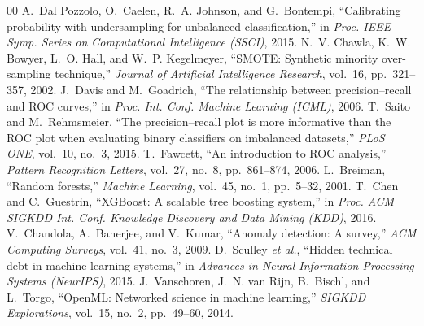 \documentclass[conference]{IEEEtran}
\begin{document}
\begin{thebibliography}{00}
 A.~Dal Pozzolo, O.~Caelen, R.~A. Johnson, and
G.~Bontempi, ``Calibrating probability with undersampling for unbalanced
classification,'' in \emph{Proc. IEEE Symp. Series on Computational
Intelligence (SSCI)}, 2015.
 N.~V. Chawla, K.~W. Bowyer, L.~O. Hall, and
W.~P. Kegelmeyer, ``SMOTE: Synthetic minority over-sampling technique,''
\emph{Journal of Artificial Intelligence Research}, vol.~16, pp.~321--357,
2002.
 J.~Davis and M.~Goadrich, ``The relationship between
precision--recall and ROC curves,'' in \emph{Proc. Int. Conf. Machine Learning
(ICML)}, 2006.
 T.~Saito and M.~Rehmsmeier, ``The precision--recall plot
is more informative than the ROC plot when evaluating binary classifiers on
imbalanced datasets,'' \emph{PLoS ONE}, vol.~10, no.~3, 2015.
 T.~Fawcett, ``An introduction to ROC analysis,''
\emph{Pattern Recognition Letters}, vol.~27, no.~8, pp.~861--874, 2006.
 L.~Breiman, ``Random forests,'' \emph{Machine
Learning}, vol.~45, no.~1, pp.~5--32, 2001.
 T.~Chen and C.~Guestrin, ``XGBoost: A scalable tree
boosting system,'' in \emph{Proc. ACM SIGKDD Int. Conf. Knowledge Discovery
and Data Mining (KDD)}, 2016.
 V.~Chandola, A.~Banerjee, and V.~Kumar, ``Anomaly
detection: A survey,'' \emph{ACM Computing Surveys}, vol.~41, no.~3, 2009.
 D.~Sculley \emph{et al.}, ``Hidden technical debt in
machine learning systems,'' in \emph{Advances in Neural Information Processing
Systems (NeurIPS)}, 2015.
 J.~Vanschoren, J.~N. van Rijn, B.~Bischl, and
L.~Torgo, ``OpenML: Networked science in machine learning,'' \emph{SIGKDD
Explorations}, vol.~15, no.~2, pp.~49--60, 2014.
\end{thebibliography}
\end{document}
